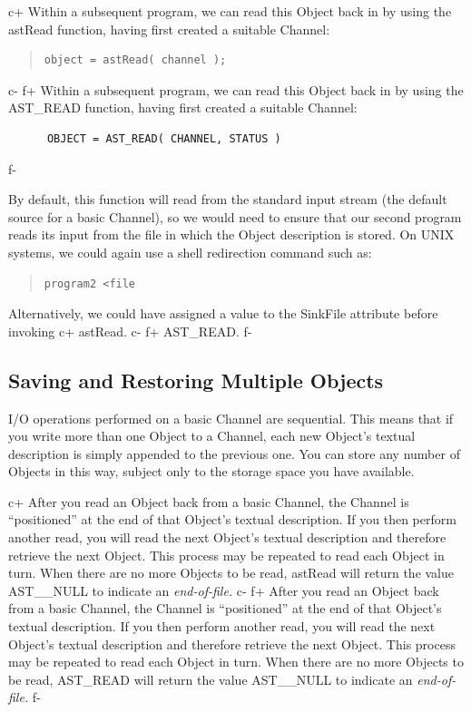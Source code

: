\documentclass[twoside,11pt]{article}
\begin{document}
c+
Within a subsequent program, we can read this Object back in by
using the astRead function, having first created a suitable
Channel:

\begin{quote}
\small
\begin{verbatim}
object = astRead( channel );
\end{verbatim}
\normalsize
\end{quote}
c-
f+
Within a subsequent program, we can read this Object back in by
using the AST\_READ function, having first created a suitable
Channel:

\small
\begin{verbatim}
      OBJECT = AST_READ( CHANNEL, STATUS )
\end{verbatim}
\normalsize
f-

By default, this function will read from the standard input stream
(the default source for a basic Channel), so we would need to ensure
that our second program reads its input from the file in which the
Object description is stored. On UNIX systems, we could again use a
shell redirection command such as:

\begin{quote}
\small
\begin{verbatim}
program2 <file
\end{verbatim}
\normalsize
\end{quote}

Alternatively, we could have assigned a value to the SinkFile attribute
before invoking
c+
astRead.
c-
f+
AST\_READ.
f-

\subsection{Saving and Restoring Multiple Objects}

I/O operations performed on a basic Channel are sequential. This
means that if you write more than one Object to a Channel,
each new Object's textual description is simply appended to the
previous one. You can store any number of Objects in this way,
subject only to the storage space you have available.

c+
After you read an Object back from a basic Channel, the
Channel is ``positioned'' at the end of that Object's
textual description. If you then perform another read, you will
read the next Object's textual description and therefore
retrieve the next Object.  This process may be repeated to read
each Object in turn. When there are no more Objects to be
read, astRead will return the value AST\_\_NULL to indicate an
{\em{end-of-file.}}
c-
f+
After you read an Object back from a basic Channel, the
Channel is ``positioned'' at the end of that Object's
textual description. If you then perform another read, you will
read the next Object's textual description and therefore
retrieve the next Object.  This process may be repeated to read
each Object in turn. When there are no more Objects to be
read, AST\_READ will return the value AST\_\_NULL to indicate an
{\em{end-of-file.}}
f-
\end{document}
